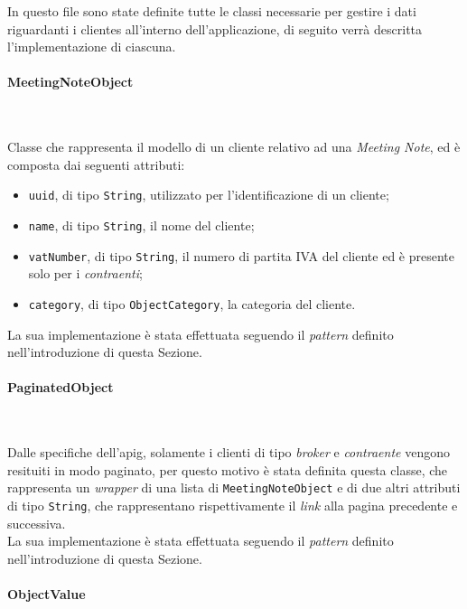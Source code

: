 In questo file sono state definite tutte le classi necessarie per gestire i dati riguardanti i \glspl{cliente} all'interno dell'applicazione, di seguito verrà descritta l'implementazione di ciascuna.

\paragraph*{MeetingNoteObject} ~ \\
\label{par:meeting-note-object}

\noindent Classe che rappresenta il modello di un \gls{cliente} relativo ad una \emph{Meeting Note}, ed è composta dai seguenti attributi:
\begin{itemize}
    \item \lstinline{uuid}, di tipo \lstinline{String}, utilizzato per l'identificazione di un \gls{cliente}\glsoccur;
    \item \lstinline{name}, di tipo \lstinline{String}, il nome del \gls{cliente}\glsoccur;
    \item \lstinline{vatNumber}, di tipo \lstinline{String}, il numero di partita IVA del \gls{cliente} ed è presente solo per i \emph{contraenti};
    \item \lstinline{category}, di tipo \lstinline{ObjectCategory}, la categoria del \gls{cliente}\glsoccur.
\end{itemize}
La sua implementazione è stata effettuata seguendo il \emph{pattern} definito nell'introduzione di questa Sezione.

\paragraph*{PaginatedObject} ~ \\
\label{par:paginated-object}

\noindent Dalle specifiche dell'\gls{apig}\glsoccur, solamente i clienti di tipo \emph{broker} e \emph{contraente} vengono resituiti in modo paginato, per questo motivo è stata definita questa classe, che rappresenta un \emph{wrapper} di una lista di \lstinline{MeetingNoteObject} e di due altri attributi di tipo \lstinline{String}, che rappresentano rispettivamente il \emph{link} alla pagina precedente e successiva.\\
La sua implementazione è stata effettuata seguendo il \emph{pattern} definito nell'introduzione di questa Sezione.

\paragraph*{ObjectValue} ~ \\
\label{par:object-value}

